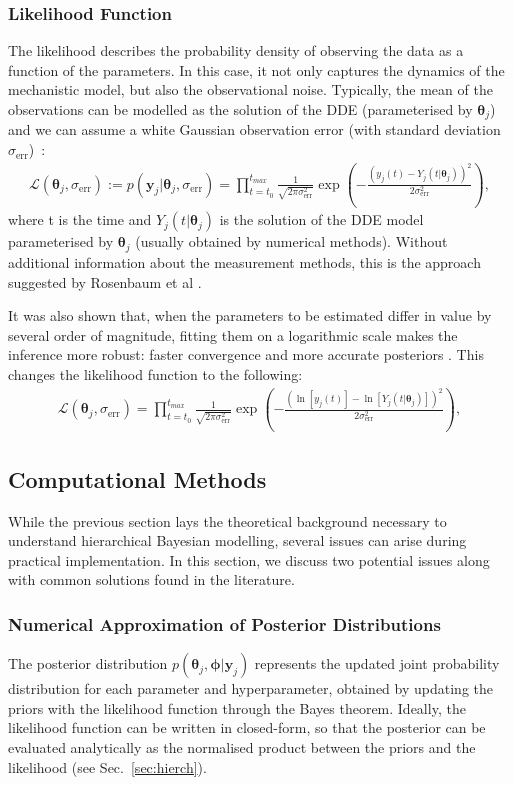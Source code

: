 \documentclass[11pt]{article}
\begin{document}
\subsubsection{Likelihood Function}
The likelihood describes the probability density of observing the data as a function of the parameters. In this case, it not only captures the dynamics of the mechanistic model, but also the observational noise. Typically, the mean of the observations can be modelled as the solution of the DDE (parameterised by $\boldsymbol{\theta}_j$) and we can assume a white Gaussian observation error (with standard deviation $\sigma_\text{err}$)~\cite{liu_wang}\cite{likelihood_2}:
\begin{align*}
    \mathcal{L}(\boldsymbol{\theta}_j, \sigma_\text{err}) := p(\boldsymbol{y}_j | \boldsymbol{\theta}_j, \sigma_\text{err}) =  \prod_{t=t_0}^{t_{max}} \frac{1}{\sqrt{2\pi\sigma_\text{err}^2}} \exp\left(-\frac{(y_{j}(t) - Y_j(t|\boldsymbol{\theta}_j))^2}{2\sigma_\text{err}^2}\right),
\end{align*}
where t is the time and $Y_j(t|\boldsymbol{\theta}_j)$ is the solution of the DDE model parameterised by $\boldsymbol{\theta}_j$ (usually obtained by numerical methods). Without additional information about the measurement methods, this is the approach suggested by Rosenbaum et al \cite{rosenbaum}. 

It was also shown that, when the parameters to be estimated differ in value by several order of magnitude, fitting them on a logarithmic scale makes the inference more robust: faster convergence and more accurate posteriors \cite{rosenbaum}. This changes the likelihood function to the following:
\begin{align*}
    \mathcal{L}(\boldsymbol{\theta}_j, \sigma_\text{err}) = \prod_{t=t_0}^{t_{max}} \frac{1}{\sqrt{2\pi\sigma_\text{err}^2}} \exp\left(-\frac{(\ln[y_{j}(t)] - \ln[Y_j(t|\boldsymbol{\theta}_j)])^2}{2\sigma_\text{err}^2}\right),
\end{align*}

\subsection{Computational Methods}
While the previous section lays the theoretical background necessary to understand hierarchical Bayesian modelling, several issues can arise during practical implementation. In this section, we discuss two potential issues along with common solutions found in the literature.
\subsubsection{Numerical Approximation of Posterior Distributions}\label{sec:mcmc}
The posterior distribution $p(\boldsymbol{\theta}_j,\boldsymbol{\phi}|\boldsymbol{y}_j)$ represents the updated joint probability distribution for each parameter and hyperparameter, obtained by updating the priors with the likelihood function through the Bayes theorem. Ideally, the likelihood function can be written in closed-form, so that the posterior can be evaluated analytically as the normalised product between the priors and the likelihood (see Sec.~\ref{sec:hierch}).
\end{document}
